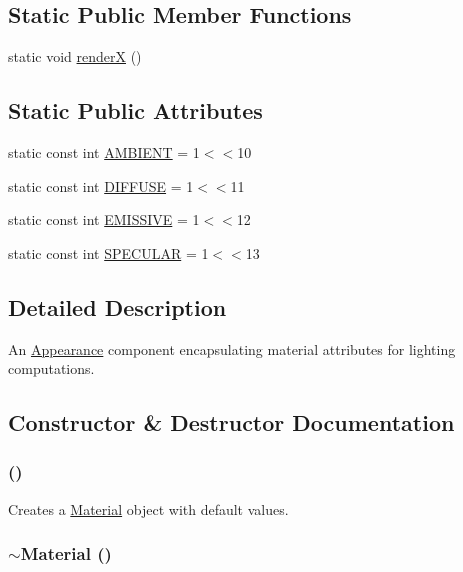 \subsection*{Static Public Member Functions}
\begin{CompactItemize}
\item 
static void \hyperlink{classm3g_1_1Material_443a7a301f77f625335ecc06d13bad06}{renderX} ()
\end{CompactItemize}
\subsection*{Static Public Attributes}
\begin{CompactItemize}
\item 
static const int \hyperlink{classm3g_1_1Material_4cf648a82d9de62a1fb15f4277049594}{AMBIENT} = 1$<$$<$10
\item 
static const int \hyperlink{classm3g_1_1Material_9798073e44254569f47464dc6bf5da89}{DIFFUSE} = 1$<$$<$11
\item 
static const int \hyperlink{classm3g_1_1Material_b92d57adf6955eae6adac15e865659cd}{EMISSIVE} = 1$<$$<$12
\item 
static const int \hyperlink{classm3g_1_1Material_cac20b25665d9a3713bec3a772a89ede}{SPECULAR} = 1$<$$<$13
\end{CompactItemize}


\subsection{Detailed Description}
An \hyperlink{classm3g_1_1Appearance}{Appearance} component encapsulating material attributes for lighting computations. 

\subsection{Constructor \& Destructor Documentation}
\hypertarget{classm3g_1_1Material_ade2019060d01e7983e9bc40ea6aa404}{
\subsubsection[{Material}]{ ()}}
\label{classm3g_1_1Material_ade2019060d01e7983e9bc40ea6aa404}


Creates a \hyperlink{classm3g_1_1Material}{Material} object with default values. \hypertarget{classm3g_1_1Material_b15b7efa255e5cca9b02a031a783cfe8}{
\subsubsection[{$\sim$Material}]{\setlength{\rightskip}{0pt plus 5cm}$\sim${\bf Material} ()}}
\label{classm3g_1_1Material_b15b7efa255e5cca9b02a031a783cfe8}


